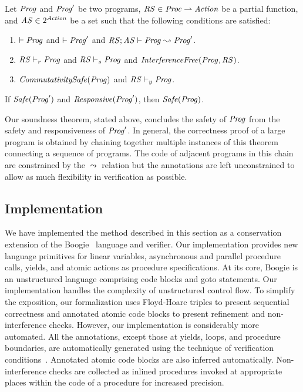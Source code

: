 \begin{theorem}
Let $\mathit{Prog}$ and $\mathit{Prog}'$ be two programs, $\mathit{RS} \in \mathit{Proc} \rightharpoonup \mathit{Action}$ be a partial function,
and $\mathit{AS} \in 2^{\mathit{Action}}$ be a set such that the following conditions are satisfied:
\begin{enumerate}
\item
$\vdash \mathit{Prog}$ and $\vdash \mathit{Prog}'$ and $\mathit{RS};\mathit{AS} \vdash \mathit{Prog} \leadsto \mathit{Prog}'$.
\item
$\mathit{RS} \vdash_r \mathit{Prog}$ and $\mathit{RS} \vdash_s \mathit{Prog}$ and $\mathit{InterferenceFree}(\mathit{Prog},\mathit{RS})$.
\item
$\mathit{CommutativitySafe}(\mathit{Prog})$ and $\mathit{RS} \vdash_y \mathit{Prog}$.
\end{enumerate}
If $\mathit{Safe}(\mathit{Prog}')$ and $\mathit{Responsive}(\mathit{Prog}')$, then $\mathit{Safe}(\mathit{Prog})$.
\end{theorem}

Our soundness theorem, stated above, concludes the safety of $\mathit{Prog}$ from the safety and responsiveness of $\mathit{Prog}'$.
In general, the correctness proof of a large program is obtained by chaining together
multiple instances of this theorem connecting a sequence of programs.  
The code of adjacent programs in this chain are constrained by the $\leadsto$ relation but the annotations are left 
unconstrained to allow as much flexibility in verification as possible.

\subsection{Implementation}
\label{sec:implementation}

We have implemented the method described in this section as a conservation extension 
of the Boogie~\cite{BarnettCDJL05} language and verifier.
Our implementation provides new language primitives for linear variables, asynchronous and parallel procedure calls, 
yields, and atomic actions as procedure specifications.
At its core, Boogie is an unstructured language comprising code blocks and goto statements.
Our implementation handles the complexity of unstructured control flow.
To simplify the exposition, our formalization uses Floyd-Hoare triples to present sequential correctness and 
annotated atomic code blocks to present refinement and non-interference checks.
However, our implementation is considerably more automated.  
All the annotations, except those at yields, loops, and procedure boundaries, are automatically generated 
using the technique of verification conditions~\cite{BL05}.
Annotated atomic code blocks are also inferred automatically.
Non-interference checks are collected as inlined procedures
invoked at appropriate places within the code of a procedure for increased precision.

